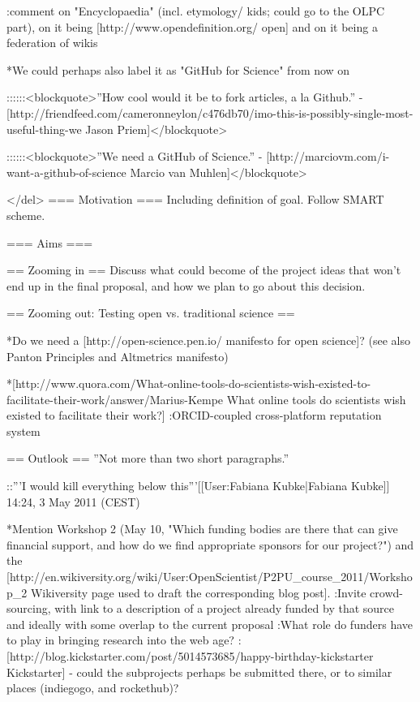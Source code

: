 :comment on "Encyclopaedia" (incl. etymology/ kids; could go to the OLPC part), on it being [http://www.opendefinition.org/ open] and on it being a federation of wikis

*We could perhaps also label it as "GitHub for Science" from now on

::::::<blockquote>''How cool would it be to fork articles, a la Github.'' - [http://friendfeed.com/cameronneylon/c476db70/imo-this-is-possibly-single-most-useful-thing-we Jason Priem]</blockquote>

::::::<blockquote>''We need a GitHub of Science.'' - [http://marciovm.com/i-want-a-github-of-science Marcio van Muhlen]</blockquote>

</del>
=== Motivation ===
Including definition of goal. Follow SMART scheme.

=== Aims ===

== Zooming in ==
Discuss what could become of the project ideas that won't end up in the final proposal, and how we plan to go about this decision.

== Zooming out: Testing open vs. traditional science ==

*Do we need a [http://open-science.pen.io/ manifesto for open science]? (see also Panton Principles and Altmetrics manifesto)

*[http://www.quora.com/What-online-tools-do-scientists-wish-existed-to-facilitate-their-work/answer/Marius-Kempe What online tools do scientists wish existed to facilitate their work?]
:ORCID-coupled cross-platform reputation system

== Outlook ==
''Not more than two short paragraphs.''


::'''I would kill everything below this'''[[User:Fabiana Kubke|Fabiana Kubke]] 14:24, 3 May 2011 (CEST)

*Mention Workshop 2 (May 10, "Which funding bodies are there that can give financial support, and how do we find appropriate sponsors for our project?") and the [http://en.wikiversity.org/wiki/User:OpenScientist/P2PU_course_2011/Workshop_2 Wikiversity page used to draft the corresponding blog post].
:Invite crowd-sourcing, with link to a description of a project already funded by that source and ideally with some overlap to the current proposal
:What role do funders have to play in bringing research into the web age?
:[http://blog.kickstarter.com/post/5014573685/happy-birthday-kickstarter Kickstarter] - could the subprojects perhaps be submitted there, or to similar places (indiegogo, and rockethub)?

